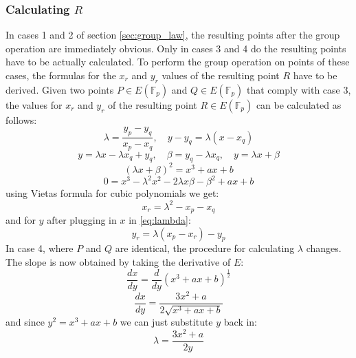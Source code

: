 \subsubsection{Calculating $R$}\label{sec:xr_yr}
	In cases 1 and 2 of section \ref{sec:group_law}, the resulting points after the group operation are immediately obvious. Only in cases 3 and 4 do the resulting points have to be actually calculated. 
	To perform the group operation on points of these cases, the formulas for the $x_r$ and $y_r$ values of the resulting point $R$ have to be derived.\newline
	Given two points $P \in E(\mathbb{F}_p)$ and $Q \in E(\mathbb{F}_p)$ that comply with case 3, the values for $x_r$ and $y_r$ of the resulting point $R \in E(\mathbb{F}_p)$ can be calculated as follows:
\begin{equation}
	\lambda = \frac{y_p-y_q}{x_p-x_q}, \quad y-y_q=\lambda(x-x_q) \label{eq:lambda}
\end{equation}
	$$y=\lambda x - \lambda x_q + y_q, \quad \beta=y_q-\lambda x_q, \quad y=\lambda x + \beta$$
	$$(\lambda x + \beta)^2 = x^3 + ax + b$$
	$$0 = x^3 - \lambda^2x^2 - 2\lambda x \beta - \beta^2 + ax + b$$
	using Vietas formula for cubic polynomials we get:
	$$x_r = \lambda^2 - x_p - x_q$$
	and for $y$ after plugging in $x$ in \ref{eq:lambda}:
	$$y_r = \lambda(x_p - x_r) - y_p$$
	In case 4, where $P$ and $Q$ are identical, the procedure for calculating $\lambda$ changes. The slope is now obtained by taking the derivative of $E$:
	$$\frac{dx}{dy} = \frac{d}{dy}(x^3+ax+b)^\frac{1}{2}$$
	$$\frac{dx}{dy} = \frac{3x^2 + a}{2\sqrt{x^3+ax+b}}$$
	and since $y^2 = x^3 + ax+b$ we can just substitute $y$ back in:
	$$\lambda = \frac{3x^2 + a}{2y}$$


